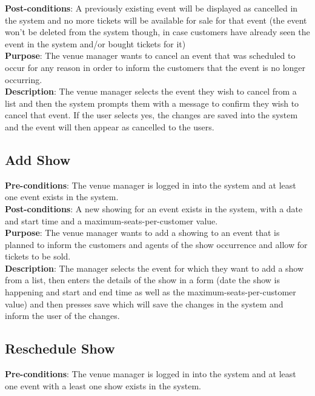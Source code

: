 \textbf{Post-conditions}: A previously existing event will be displayed
as cancelled in the system and no more tickets will be available for sale
for that event (the event won't be deleted from the system though, in case
customers have already seen the event in the system and/or bought tickets
for it)\\

\textbf{Purpose}: The venue manager wants to cancel an event that was
scheduled to occur for any reason in order to inform the customers
that the event is no longer occurring.\\

\textbf{Description}: The venue manager selects the event they wish to
cancel from a list and then the system prompts them with a message
to confirm they wish to cancel that event. If the user selects yes, the
changes are saved into the system and the event will then appear as
cancelled to the users.

\subsection{Add Show}
\textbf{Pre-conditions}: The venue manager is logged in into the system
and at least one event exists in the system.\\

\textbf{Post-conditions}: A new showing for an event exists in the system,
with a date and start time and a maximum-seats-per-customer value.\\

\textbf{Purpose}: The venue manager wants to add a showing to an event
that is planned to inform the customers and agents of the show occurrence
and allow for tickets to be sold.\\

\textbf{Description}: The manager selects the event for which they
want to add a show from a list, then enters the details of the show
in a form (date the show is happening and start and end time as well
as the maximum-seats-per-customer value) and then presses save which
will save the changes in the system and inform the user of the changes.

\subsection{Reschedule Show}
\textbf{Pre-conditions}: The venue manager is logged in into the system
and at least one event with a least one show exists in the system.\\

